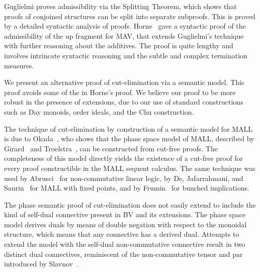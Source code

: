Guglielmi \cite[\S4.1]{Guglielmi14:di} proves admissibility via the Splitting Theorem, which shows that proofs of conjoined structures can be split into separate subproofs. This is proved by a detailed syntactic analysis of proofs. Horne~\cite{Horne15:mav} gave a syntactic proof of the admissibility of the up fragment for MAV, that extends Guglielmi's technique with further reasoning about the additives. The proof is quite lengthy and involves intrincate syntactic reasoning and the subtle and complex termination measures.

We present an alternative proof of cut-elimination via a semantic model. This proof avoids some of the in Horne's proof. We believe our proof to be more robust in the presence of extensions, due to our use of standard constructions such as Day monoids, order ideals, and the Chu construction.

The technique of cut-elimination by construction of a semantic model for MALL is due to Okada~\cite{Okada99:psc}, who shows that the phase space model of MALL, described by Girard~\cite[\S4.1]{Girard87:ll} and Troelstra~\cite[]{Troelstra92:lll}, can be constructed from cut-free proofs.
The completeness of this model directly yields the existence of a cut-free proof for every proof constructible in the MALL sequent calculus.
The same technique was used by Abrusci~\cite{Abrusci91:psc} for non-commutative linear logic, by De, Jafarrahmani, and Saurin~\cite{De22:psc} for MALL with fixed points, and by Frumin~\cite{Frumin22:psc} for bunched implications.

The phase semantic proof of cut-elimination does not easily extend to include the kind of self-dual connective present in BV and its extensions.
The phase space model derives duals by means of double negation with respect to the monoidal structure, which means that any connective has a derived dual. Attempts to extend the model with the self-dual non-commutative connective result in two distinct dual connectives, reminiscent of the non-commutative tensor and par introduced by Slavnov~\cite{Slavnov19:scmll}.

